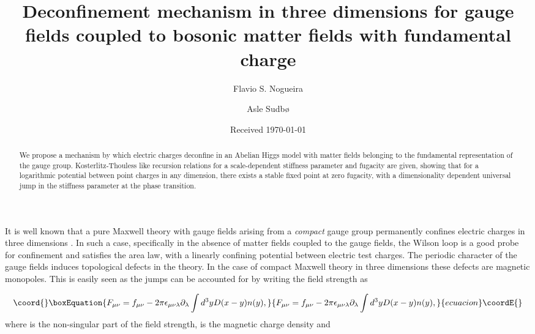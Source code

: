 \documentclass[a4paper,showpacs,preprintnumbers,amsmath,amssymb,prl,twocolumn]{revtex4}
\begin{document}
\title{Deconfinement mechanism in three dimensions 
for gauge fields coupled to bosonic matter fields with fundamental 
charge}
\author{Flavio S. Nogueira}
\author{Asle Sudb{\o}}
\date{Received \today}

\begin{abstract}
We propose a mechanism by which electric charges deconfine 
in an Abelian Higgs model with matter fields belonging to 
the fundamental representation of the gauge group. 
Kosterlitz-Thouless like recursion relations for a
scale-dependent stiffness parameter and fugacity are given,
showing that for a logarithmic potential between point 
charges in any dimension, there exists a stable fixed point 
at zero fugacity, with a dimensionality dependent universal 
jump in the stiffness parameter at the phase transition. 
\end{abstract}

\maketitle


It is well known that a pure Maxwell theory with gauge fields arising 
from a {\it compact} \coordHE{} gauge group permanently confines 
electric charges in three dimensions \cite{Polyakov}. In such a case,
specifically in the absence of matter fields coupled to the gauge fields,  
the Wilson loop is a good probe for confinement and satisfies 
the area law, with a linearly confining potential between electric 
test charges. The periodic character of the gauge fields induces 
topological defects in the theory. In the case of compact Maxwell theory 
in three dimensions these defects are magnetic monopoles. This is easily 
seen as the \myHighlight{$2\pi$}\coordHE{} jumps can be accounted for by writing the field strength 
as

\begin{equation}\coord{}\boxEquation{
\label{F}
F_{\mu\nu}=f_{\mu\nu}-2\pi\epsilon_{\mu\nu\lambda}
\partial_\lambda\int d^3y D(x-y)n(y),
}{
F_{\mu\nu}=f_{\mu\nu}-2\pi\epsilon_{\mu\nu\lambda}
\partial_\lambda\int d^3y D(x-y)n(y),
}{ecuacion}\coordE{}\end{equation}
where \coordHE{} is the non-singular part of the field strength, 
\coordHE{} is the magnetic charge density and 
\end{document}
